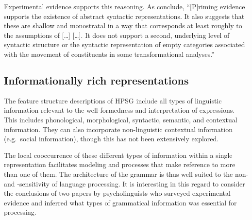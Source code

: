 \documentclass[output=paper
	        ,collection
	        ,collectionchapter
 	        ,biblatex
                ,babelshorthands
                ,newtxmath
                ,draftmode
                ,colorlinks, citecolor=brown
]{langscibook}
\begin{document}
Experimental evidence supports this reasoning.  As \citet[]{BraniganPickering2017} conclude,
``[P]riming evidence supports the existence of abstract syntactic representations. It also suggests
that these are shallow and monostratal in a way that corresponds at least roughly to the assumptions
of [\ldots{}] \citet{ps2} [\ldots{}]. It does not support a second, underlying level of syntactic
structure or the syntactic representation of empty categories associated with the movement of
constituents in some transformational analyses.''

\subsection{Informationally rich representations}

The feature structure descriptions of HPSG include all types of linguistic information relevant to the well-formedness and interpretation of expressions. This includes phonological, morphological, syntactic, semantic, and contextual information.  They can also incorporate non-linguistic contextual information (e.g.\ social information), though this has not been extensively explored.

The local cooccurrence of these different types of information within a single
representation facilitates modeling  and  processes that make
reference to more than one of them.  The architecture of the grammar is thus well suited to the
non- and -sensitivity of language processing.  It is interesting in
this regard to consider the conclusions of two papers by psycholinguists who surveyed experimental
evidence and inferred what types of grammatical information was essential for processing.
\end{document}
